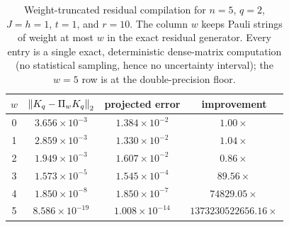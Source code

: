 \begin{table}[t]
\caption{Weight-truncated residual compilation for $n=5$, $q=2$, $J=h=1$, $t=1$, and $r=10$. The column $w$ keeps Pauli strings of weight at most $w$ in the exact residual generator. Every entry is a single exact, deterministic dense-matrix computation (no statistical sampling, hence no uncertainty interval); the $w=5$ row is at the double-precision floor.}
\label{tab:projected-summary}
\centering
\begin{tabular}{cccc}
\toprule
$w$ & $\left\lVert K_q-\Pi_wK_q \right\rVert_2$ & projected error & improvement\\
\midrule
0 & $3.656\times10^{-3}$ & $1.384\times10^{-2}$ & $1.00\times$\\
1 & $2.859\times10^{-3}$ & $1.330\times10^{-2}$ & $1.04\times$\\
2 & $1.949\times10^{-3}$ & $1.607\times10^{-2}$ & $0.86\times$\\
3 & $1.573\times10^{-5}$ & $1.545\times10^{-4}$ & $89.56\times$\\
4 & $1.850\times10^{-8}$ & $1.850\times10^{-7}$ & $74829.05\times$\\
5 & $8.586\times10^{-19}$ & $1.008\times10^{-14}$ & $1373230522656.16\times$\\
\bottomrule
\end{tabular}
\end{table}
